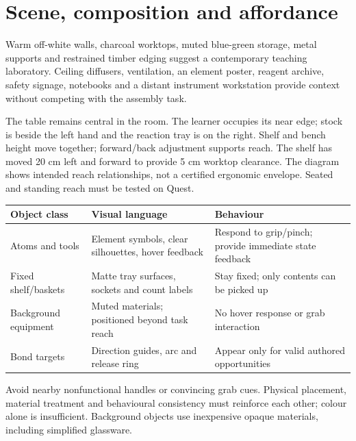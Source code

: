 \section*{Scene, composition and affordance}
Warm off-white walls, charcoal worktops, muted blue-green storage, metal supports and restrained timber edging suggest a contemporary teaching laboratory. Ceiling diffusers, ventilation, an element poster, reagent archive, safety signage, notebooks and a distant instrument workstation provide context without competing with the assembly task.



The table remains central in the room. The learner occupies its near edge; stock is beside the left hand and the reaction tray is on the right. Shelf and bench height move together; forward/back adjustment supports reach. The shelf has moved 20 cm left and forward to provide 5 cm worktop clearance. The diagram shows intended reach relationships, not a certified ergonomic envelope. Seated and standing reach must be tested on Quest.

\begin{tabularx}{\linewidth}{@{}p{31mm}YY@{}}\toprule
Object class & Visual language & Behaviour\\\midrule
Atoms and tools & Element symbols, clear silhouettes, hover feedback & Respond to grip/pinch; provide immediate state feedback\\
Fixed shelf/baskets & Matte tray surfaces, sockets and count labels & Stay fixed; only contents can be picked up\\
Background equipment & Muted materials; positioned beyond task reach & No hover response or grab interaction\\
Bond targets & Direction guides, arc and release ring & Appear only for valid authored opportunities\\\bottomrule
\end{tabularx}

Avoid nearby nonfunctional handles or convincing grab cues. Physical placement, material treatment and behavioural consistency must reinforce each other; colour alone is insufficient. Background objects use inexpensive opaque materials, including simplified glassware.
